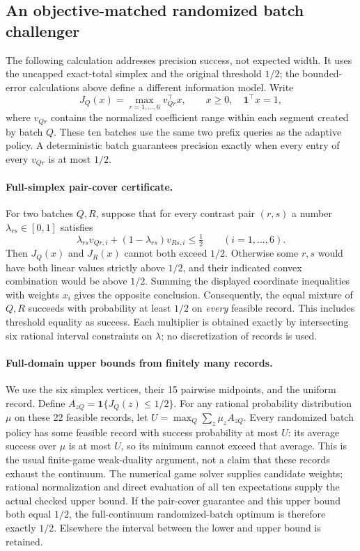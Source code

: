 \subsection{An objective-matched randomized batch challenger}
\label{sec:joint-precision-challenger}
The following calculation addresses precision success, not expected width.
It uses the uncapped exact-total simplex and the original threshold $1/2$;
the bounded-error calculations above define a different information model.
Write
\[
 J_Q(x)=\max_{r=1,\ldots,6}v_{Qr}^{\top}x,
 \qquad x\geq0,\quad\boldsymbol1^\top x=1,
\]
where $v_{Qr}$ contains the normalized coefficient range within each segment
created by batch $Q$.  These ten batches use the same two prefix queries as
the adaptive policy.  A deterministic batch guarantees precision exactly
when every entry of every $v_{Qr}$ is at most $1/2$.

\paragraph{Full-simplex pair-cover certificate.}
For two batches $Q,R$, suppose that for every contrast pair $(r,s)$ a
number $\lambda_{rs}\in[0,1]$ satisfies
\[
 \lambda_{rs}v_{Qr,i}+(1-\lambda_{rs})v_{Rs,i}
 \leq\tfrac12\qquad(i=1,\ldots,6).
\]
Then $J_Q(x)$ and $J_R(x)$ cannot both exceed $1/2$.  Otherwise some $r,s$
would have both linear values strictly above $1/2$, and their indicated
convex combination would be above $1/2$.  Summing the displayed coordinate
inequalities with weights $x_i$ gives the opposite conclusion.  Consequently,
the equal mixture of $Q,R$ succeeds with probability at least $1/2$ on
\emph{every} feasible record.  This includes threshold equality as success.
Each multiplier is obtained exactly by intersecting six rational interval
constraints on $\lambda$; no discretization of records is used.

\paragraph{Full-domain upper bounds from finitely many records.}
We use the six simplex vertices, their 15 pairwise midpoints, and the
uniform record.  Define $A_{zQ}=\boldsymbol1\{J_Q(z)\leq1/2\}$.
For any rational probability distribution $\mu$ on these 22 feasible
records, let $U=\max_Q\sum_z\mu_z A_{zQ}$.  Every randomized batch policy
has some feasible record with success probability at most $U$: its
average success over $\mu$ is at most $U$, so its minimum cannot exceed
that average.  This is the usual finite-game weak-duality argument, not
a claim that these records exhaust the continuum.  The numerical game
solver supplies candidate weights; rational normalization and direct
evaluation of all ten expectations supply the actual checked upper bound.
If the pair-cover guarantee and this upper bound both equal $1/2$, the
full-continuum randomized-batch optimum is therefore exactly $1/2$.
Elsewhere the interval between the lower and upper bound is retained.

